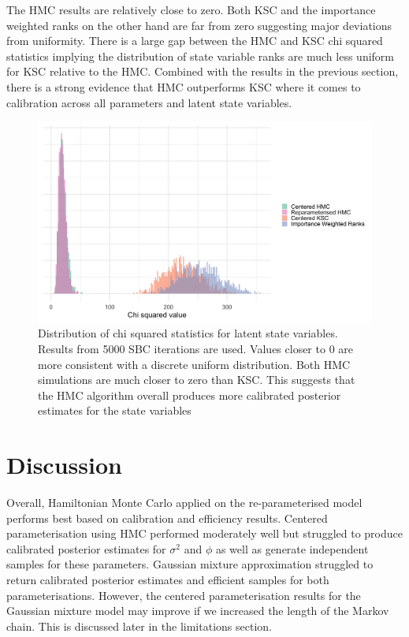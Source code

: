 \documentclass[12pt, a4paper]{article}
\begin{document}
    The HMC results are relatively close to zero. Both KSC and the importance weighted ranks on the other hand are far from zero suggesting major deviations from uniformity. There is a large gap between the HMC and KSC chi squared statistics implying the distribution of state variable ranks are much less uniform for KSC relative to the HMC. Combined with the results in the previous section, there is a strong evidence that HMC outperforms KSC where it comes to calibration across all parameters and latent state variables.

    \begin{figure}[H]
        \centering
        \includegraphics[scale=0.1]{results/dist_chisq_all.png}
        \caption{Distribution of chi squared statistics for latent state variables. Results from 5000 SBC iterations are used. Values closer to 0 are more consistent with a discrete uniform distribution. Both HMC simulations are much closer to zero than KSC. This suggests that the HMC algorithm overall produces more calibrated posterior estimates for the state variables}
        \label{fig:allchisq}
    \end{figure}

\section{Discussion}
Overall, Hamiltonian Monte Carlo applied on the re-parameterised model performs best based on calibration and efficiency results. Centered parameterisation using HMC performed moderately well but struggled to produce calibrated posterior estimates for $\sigma^2$ and $\phi$ as well as generate independent samples for these parameters. Gaussian mixture approximation struggled to return calibrated posterior estimates and efficient samples for both parameterisations. However, the centered parameterisation results for the Gaussian mixture model may improve if we increased the length of the Markov chain. This is discussed later in the limitations section. 
\end{document}
